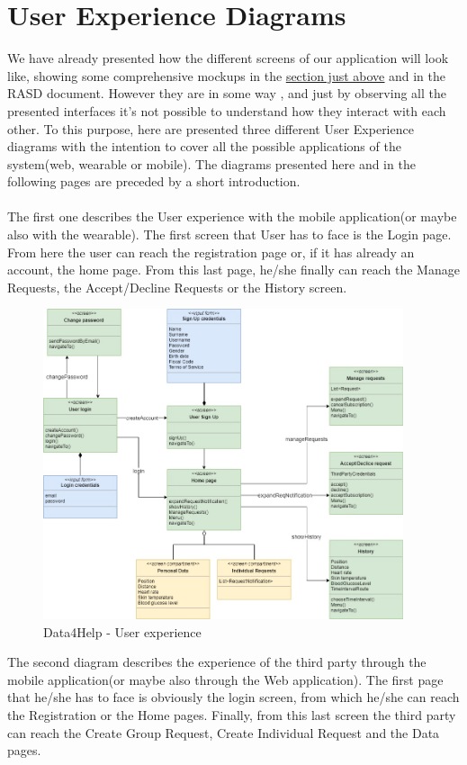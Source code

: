 \section{User Experience Diagrams}
We have already presented how the different screens of our application will look like, showing some comprehensive mockups in the \hyperlink{MK}{\underline{section just above}} and in the RASD document. However they are in some way , and just by observing all the presented interfaces it's not possible to understand how they interact with each other.
To this purpose, here are presented three different User Experience diagrams with the intention to cover all the possible applications of the system(web, wearable or mobile).
The diagrams presented here and in the following pages are preceded by a short introduction.\\ \\
The first one describes the User experience with the mobile application(or maybe also with the wearable). The first screen that User has to face is the Login page. From here the user can reach the registration page or, if it has already an account, the home page. From this last page, he/she finally can reach the Manage Requests, the Accept/Decline Requests or the History screen.
\begin{figure}[ht]
    \centering
    \includegraphics[width=300pt]{images/UX/UX_Diagram1.jpg}
    \caption{Data4Help - User experience}
    \label{UX1}
\end{figure}
\clearpage
The second diagram describes the experience of the third party through the mobile application(or maybe also through the Web application). The first page that he/she has to face is obviously the login screen, from which he/she can reach the Registration or the Home pages. Finally, from this last screen the third party can reach the Create Group Request, Create Individual Request and the Data pages.
